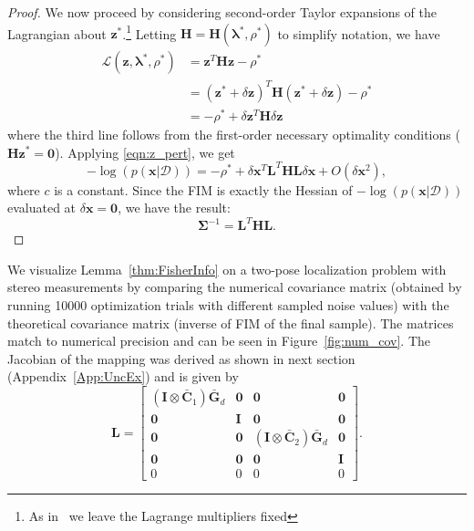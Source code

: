 \documentclass[lettersize,journal]{IEEEtran}
\begin{document}
\begin{proof}
We now proceed by considering second-order Taylor expansions of the Lagrangian about $\bm{z}^*$.\footnote{As in~\cite[Theorem 12.5]{nocedalNumericalOptimization2006} we leave the Lagrange multipliers fixed} Letting  $\bm{H}= \bm{H}(\bm{\lambda}^*, \rho^*)$ to simplify notation, we have
\begin{align*}
	\mathcal{L}(\bm{z},\bm{\lambda}^*, \rho^*) & =\bm{z}^T \bm{H} \bm{z} - \rho^* \\ 
	&= (\bm{z}^*+\delta\bm{z})^T \bm{H} (\bm{z}^*+\delta\bm{z}) - \rho^* \\ 
	&= -\rho^* + \delta\bm{z}^T \bm{H}\delta\bm{z}
\end{align*}
where the third line follows from the first-order necessary optimality conditions ($\bm{H} \bm{z}^*=\bm{0}$). Applying \eqref{eqn:z_pert}, we get
\begin{equation*}
	-\log(p(\bm{x} \vert \bm{\mathcal{D}})) = -\rho^* + \delta\bm{x}^T \bm{L}^T\bm{H}\bm{L}\delta\bm{x} + O(\delta\bm{x}^2),
\end{equation*}
where $c$ is a constant. Since the FIM is exactly the Hessian of $-\log(p(\bm{x} \vert \bm{\mathcal{D}}))$ evaluated at $\delta\bm{x} = \bm{0}$, we have the result:
\begin{equation}
	\bm{\Sigma}^{-1} = \bm{L}^T\bm{H}\bm{L}.
\end{equation}
\end{proof}

We visualize Lemma~\ref{thm:FisherInfo} on a two-pose localization problem with stereo measurements by comparing the numerical covariance matrix (obtained by running 10000 optimization trials with different sampled noise values) with the theoretical covariance matrix (inverse of FIM of the final sample). The matrices match to numerical precision and can be seen in Figure~\ref{fig:num_cov}. The Jacobian of the mapping was derived as shown in next section (Appendix~\ref{App:UncEx}) and is given by
\begin{equation*}
	\bm{L} = \begin{bmatrix}
		(\bm{I}\otimes\bar{\bm{C}}_1) \bar{\bm{G}}_d & \bm{0}&\bm{0}&\bm{0}\\
		\bm{0} & \bm{I}& \bm{0}&\bm{0}\\
		\bm{0}&\bm{0} & (\bm{I}\otimes\bar{\bm{C}}_2) \bar{\bm{G}}_d& \bm{0} \\
		\bm{0}&\bm{0} & \bm{0} & \bm{I} \\
		0 & 0 & 0& 0
	\end{bmatrix}.
\end{equation*}
\end{document}
